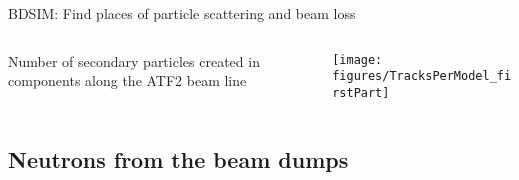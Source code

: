 \documentclass[xcolor={dvipsnames}]{beamer}
\begin{document}
\begin{frame}{BDSIM: Find places of particle scattering and beam loss}
  \begin{columns}
  \begin{column}{0.3\textwidth}
   Number of secondary particles created in components along the ATF2 beam line
  \end{column}
  \begin{column}{0.7\textwidth}
   \texttt{[image: figures/TracksPerModel\_firstPart]}
  \end{column}
 \end{columns}
\end{frame}


\subsection{Neutrons from the beam dumps}

\end{document}
